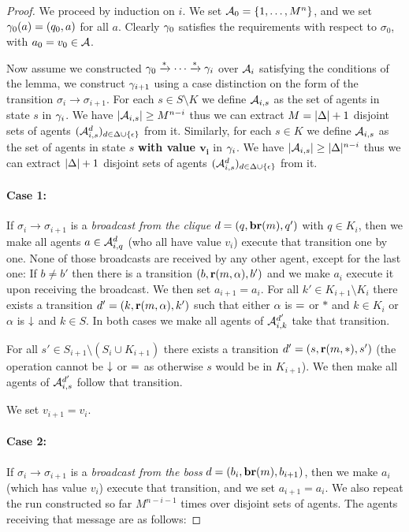 \begin{proof}

We proceed by induction on $i$.
We set $\mathcal{A}_0 = \{1, \ldots, M^n\}$, and we set $\gamma_0(a) = (q_0, a)$ for all $a$. Clearly $\gamma_0$ satisfies the requirements with respect to $\sigma_0$, with $a_0 = v_0 \in \mathcal{A}$.

Now assume we constructed $\gamma_0 \xrightarrow{*} \cdots \xrightarrow{*} \gamma_{i}$ over $\mathcal{A}_i$ satisfying the conditions of the lemma, we construct $\gamma_{i+1}$ using a case distinction on the form of the transition $\sigma_i \to \sigma_{i+1}$.
For each $s \in S\setminus K$ we define $\mathcal{A}_{i,s}$ as the set of agents in state $s$ in $\gamma_{i}$. We have $|\mathcal{A}_{i,s}| \geq M^{n-i}$ thus we can extract $M = |\Delta|+1$ disjoint sets of agents $(\mathcal{A}_{i,s}^d)_{d \in \Delta\cup\{\epsilon\}}$ from it.
Similarly, for each $s \in K$ we define $\mathcal{A}_{i,s}$ as the set of agents in state $s$ \textbf{with value $\mathbf{v_i}$} in $\gamma_{i}$. We have $|\mathcal{A}_{i,s}| \geq |\Delta|^{n-i}$ thus we can extract $|\Delta|+1$ disjoint sets of agents $(\mathcal{A}_{i,s}^d)_{d \in \Delta\cup\{\epsilon\}}$ from it.


\paragraph{Case 1: } If $\sigma_i \to \sigma_{i+1}$ is a \emph{broadcast from the clique} $d = (q, \textbf{br}(m), q')$ with $q \in K_i$, then we make all agents $a \in \mathcal{A}_{i,q}^{d}$ (who all have value $v_i$) execute that transition one by one.
None of those broadcasts are received by any other agent, except for the last one:
If $b \neq b'$ then there is a transition $(b, \textbf{r}(m, \alpha), b')$ and we make $a_i$ execute it upon receiving the broadcast. We then set $a_{i+1} = a_i$.
For all $k' \in K_{i+1} \setminus K_i$ there exists a transition $d'=(k, \textbf{r}(m, \alpha), k')$ such that either $\alpha$ is ${=}$ or $*$ and $k \in K_i$ or $\alpha$ is $\downarrow$ and $k\in S$.
In both cases we make all agents of $\mathcal{A}_{i,k}^{d'}$ take that transition.

For all $s' \in S_{i+1} \setminus (S_i \cup K_{i+1})$ there exists a transition $d'=(s,\textbf{r}(m, *),s')$ (the operation cannot be $\downarrow$ or ${=}$ as otherwise $s$ would be in $K_{i+1}$). We then make all agents of $\mathcal{A}_{i,s}^{d'}$ follow that transition. 

We set $v_{i+1} = v_i$.

\paragraph{Case 2: } If $\sigma_i \to \sigma_{i+1}$ is a \emph{broadcast from the boss} $d = (b_i, \textbf{br}(m), b_{i+1})$, then we make $a_i$ (which has value $v_i$) execute that transition, and we set $a_{i+1} = a_i$. We also repeat the run constructed so far $M^{n-i-1}$ times over disjoint sets of agents.
The agents receiving that message are as follows:


\end{proof}
